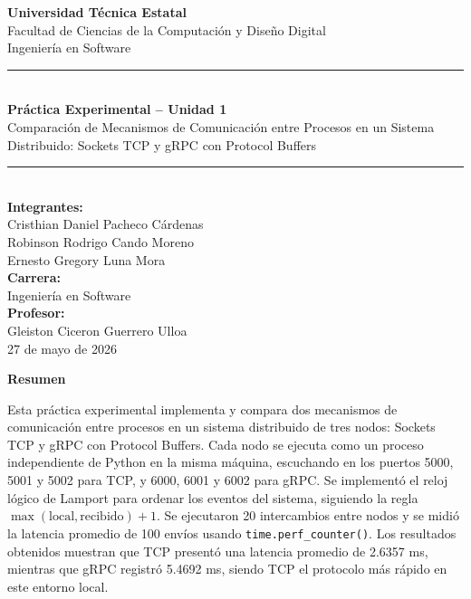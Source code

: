 \documentclass[12pt,a4paper]{article}
\begin{document}
\begin{titlepage}
    \centering
    \vspace*{1cm}
    {\large \textbf{Universidad Técnica Estatal}} \\[0.3cm]
    {\normalsize Facultad de Ciencias de la Computación y Diseño Digital} \\[0.2cm]
    {\normalsize Ingeniería en Software} \\[2cm]
    \rule{\linewidth}{0.5pt} \\[0.4cm]
    {\LARGE \textbf{Práctica Experimental -- Unidad 1}} \\[0.3cm]
    {\large Comparación de Mecanismos de Comunicación entre Procesos en un Sistema Distribuido: Sockets TCP y gRPC con Protocol Buffers} \\[0.3cm]
    \rule{\linewidth}{0.5pt} \\[2cm]
    {\normalsize \textbf{Integrantes:}} \\[0.4cm]
    {\normalsize Cristhian Daniel Pacheco Cárdenas} \\[0.2cm]
    {\normalsize Robinson Rodrigo Cando Moreno} \\[0.2cm]
    {\normalsize Ernesto Gregory Luna Mora} \\[1cm]

    {\normalsize \textbf{Carrera:}} \\[0.4cm]
    {\normalsize Ingeniería en Software} \\[1cm]
    
    {\normalsize \textbf{Profesor:}} \\[0.4cm]
    {\normalsize Gleiston Ciceron Guerrero Ulloa} \\[2cm]
    {\normalsize 27 de mayo de 2026}
    \vfill
\end{titlepage}

\thispagestyle{empty}

\begin{center}
    {\large \textbf{Resumen}}
\end{center}

Esta práctica experimental implementa y compara dos mecanismos de comunicación entre procesos en un sistema distribuido de tres nodos: Sockets TCP y gRPC con Protocol Buffers. Cada nodo se ejecuta como un proceso independiente de Python en la misma máquina, escuchando en los puertos 5000, 5001 y 5002 para TCP, y 6000, 6001 y 6002 para gRPC. Se implementó el reloj lógico de Lamport para ordenar los eventos del sistema, siguiendo la regla \(\max(\text{local}, \text{recibido}) + 1\). Se ejecutaron 20 intercambios entre nodos y se midió la latencia promedio de 100 envíos usando \texttt{time.perf\_counter()}. Los resultados obtenidos muestran que TCP presentó una latencia promedio de 2.6357 ms, mientras que gRPC registró 5.4692 ms, siendo TCP el protocolo más rápido en este entorno local.
\end{document}
